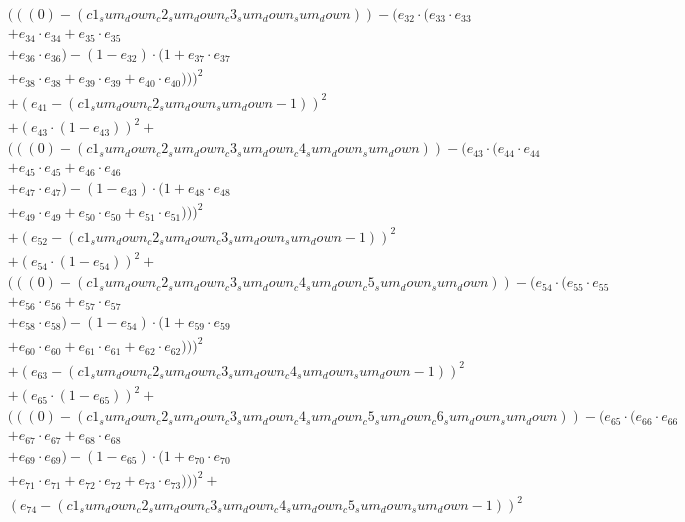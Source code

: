 \documentclass[10pt, a4paper]{article}
\begin{document}
\begin{small}
\begin{align*}
& (((0) - (c1_sum_down_c2_sum_down_c3_sum_down_sum_down)) - (e_{32} \cdot (e_{33} \cdot e_{33} \\
& + e_{34} \cdot e_{34} + e_{35} \cdot e_{35} \\
& + e_{36} \cdot e_{36}) - (1 - e_{32}) \cdot (1 + e_{37} \cdot e_{37} \\
& + e_{38} \cdot e_{38} + e_{39} \cdot e_{39} + e_{40} \cdot e_{40})))^{2} \\
& + (e_{41} - (c1_sum_down_c2_sum_down_sum_down - 1))^{2} \\
& + (e_{43} \cdot (1 - e_{43}))^{2} + \\
& (((0) - (c1_sum_down_c2_sum_down_c3_sum_down_c4_sum_down_sum_down)) - (e_{43} \cdot (e_{44} \cdot e_{44} \\
& + e_{45} \cdot e_{45} + e_{46} \cdot e_{46} \\
& + e_{47} \cdot e_{47}) - (1 - e_{43}) \cdot (1 + e_{48} \cdot e_{48} \\
& + e_{49} \cdot e_{49} + e_{50} \cdot e_{50} + e_{51} \cdot e_{51})))^{2} \\
& + (e_{52} - (c1_sum_down_c2_sum_down_c3_sum_down_sum_down - 1))^{2} \\
& + (e_{54} \cdot (1 - e_{54}))^{2} + \\
& (((0) - (c1_sum_down_c2_sum_down_c3_sum_down_c4_sum_down_c5_sum_down_sum_down)) - (e_{54} \cdot (e_{55} \cdot e_{55} \\
& + e_{56} \cdot e_{56} + e_{57} \cdot e_{57} \\
& + e_{58} \cdot e_{58}) - (1 - e_{54}) \cdot (1 + e_{59} \cdot e_{59} \\
& + e_{60} \cdot e_{60} + e_{61} \cdot e_{61} + e_{62} \cdot e_{62})))^{2} \\
& + (e_{63} - (c1_sum_down_c2_sum_down_c3_sum_down_c4_sum_down_sum_down - 1))^{2} \\
& + (e_{65} \cdot (1 - e_{65}))^{2} + \\
& (((0) - (c1_sum_down_c2_sum_down_c3_sum_down_c4_sum_down_c5_sum_down_c6_sum_down_sum_down)) - (e_{65} \cdot (e_{66} \cdot e_{66} \\
& + e_{67} \cdot e_{67} + e_{68} \cdot e_{68} \\
& + e_{69} \cdot e_{69}) - (1 - e_{65}) \cdot (1 + e_{70} \cdot e_{70} \\
& + e_{71} \cdot e_{71} + e_{72} \cdot e_{72} + e_{73} \cdot e_{73})))^{2} + \\
& (e_{74} - (c1_sum_down_c2_sum_down_c3_sum_down_c4_sum_down_c5_sum_down_sum_down - 1))^{2} \\

\end{align*}
\end{small}
\end{document}
